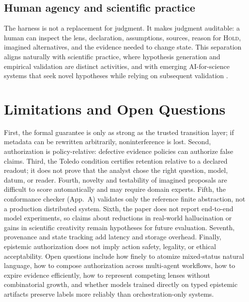 \documentclass[10pt,twocolumn]{article}
\begin{document}
\subsection{Human agency and scientific practice}
The harness is not a replacement for judgment. It makes judgment auditable: a human can inspect the lens, declaration, assumptions, sources, reason for \textsc{Hold}, imagined alternatives, and the evidence needed to change state. This separation aligns naturally with scientific practice, where hypothesis generation and empirical validation are distinct activities, and with emerging AI-for-science systems that seek novel hypotheses while relying on subsequent validation \cite{gottweis2025aicoscientist,zhang2025exploring}.

\section{Limitations and Open Questions}
First, the formal guarantee is only as strong as the trusted transition layer; if metadata can be rewritten arbitrarily, noninterference is lost. Second, authorization is policy-relative: defective evidence policies can authorize false claims. Third, the Toledo condition certifies retention relative to a declared readout; it does not prove that the analyst chose the right question, model, datum, or reader. Fourth, novelty and testability of imagined proposals are difficult to score automatically and may require domain experts. Fifth, the conformance checker (App.~A) validates only the reference finite abstraction, not a production distributed system. Sixth, the paper does not report end-to-end model experiments, so claims about reductions in real-world hallucination or gains in scientific creativity remain hypotheses for future evaluation. Seventh, provenance and state tracking add latency and storage overhead. Finally, epistemic authorization does not imply action safety, legality, or ethical acceptability. Open questions include how finely to atomize mixed-status natural language, how to compose authorization across multi-agent workflows, how to expire evidence efficiently, how to represent competing lenses without combinatorial growth, and whether models trained directly on typed epistemic artifacts preserve labels more reliably than orchestration-only systems.
\end{document}

